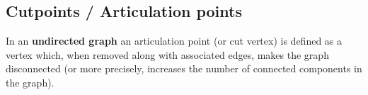 \subsection{Cutpoints / Articulation points}

\begin{definition}

In an \textbf{undirected graph} an articulation point (or cut vertex) is defined as a vertex which, when removed along with associated edges, makes the graph disconnected (or more precisely, increases the number of connected components in the graph).
        
\end{definition}
